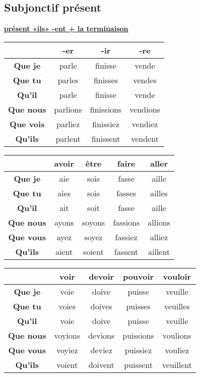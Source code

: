 \documentclass[12pt, a4paper]{article}
\begin{document}
\begin{multicols*}{3}
\subsection{Subjonctif présent}
\begin{center}
\underline{\textbf{présent «ils» -ent + la terminaison}}
\begin{tabular}{|c|c|c|c|}
  \hline
  & \textbf{-er} & \textbf{-ir} & \textbf{-re}\\\hline
  \textbf{Que je} & parle & finisse & vende \\\hline
  \textbf{Que tu} & parles & finisses & vendes \\\hline
  \textbf{Qu'il} & parle & finisse & vende \\\hline
  \textbf{Que nous} & parlions & finissions & vendions \\\hline
  \textbf{Que vois} & parliez & finissiez & vendiez \\\hline
  \textbf{Qu'ils} & parlent & finissent & vendent \\\hline
\end{tabular}
\end{center}
\begin{center}
\begin{tabular}{|c|c|c|c|c|}
  \hline
  & \textbf{avoir} & \textbf{être} & \textbf{faire} & \textbf{aller}\\\hline
  \textbf{Que je} & aie & sois & fasse & aille\\\hline
  \textbf{Que tu} & aies & sois & fasses & ailles\\\hline
  \textbf{Qu'il} & ait & soit & fasse & aille\\\hline
  \textbf{Que nous} & ayons & soyons & fassions & allions\\\hline
  \textbf{Que vous} & ayez & soyez & fassiez & alliez \\\hline
  \textbf{Qu'ils} & aient & soient & fassent & aillent \\\hline
\end{tabular}
\end{center}
\begin{center}
\begin{tabular}{|c|c|c|c|c|}
  \hline
  & \textbf{voir} & \textbf{devoir} & \textbf{pouvoir} & \textbf{vouloir}\\\hline
  \textbf{Que je} & voie & doive & puisse & veuille\\\hline
  \textbf{Que tu} & voies & doives & puisses & veuilles\\\hline
  \textbf{Qu'il} & voie & doive & puisse & veuille\\\hline
  \textbf{Que nous} & voyions &  devions & puissions & voulions\\\hline
  \textbf{Que vous} & voyiez & deviez & puissiez & vouliez \\\hline
  \textbf{Qu'ils} & voient & doivent & puissent & veuillent \\\hline
\end{tabular}
\end{center}


\end{multicols*}
\end{document}
